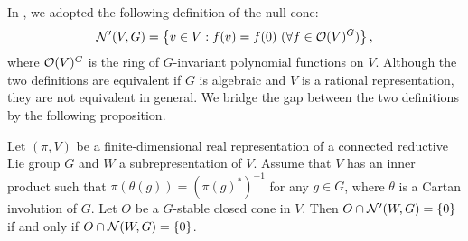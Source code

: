 In \cite{Ki24}, we adopted the following definition of the null cone:
\begin{align*}
	\mathcal{N}'(V, G) = \left\{v \in V: f(v) = f(0) \ (\forall f \in \mathcal{O}(V)^G) \right\},
\end{align*}
where $\mathcal{O}(V)^G$ is the ring of $G$-invariant polynomial functions on $V$.
Although the two definitions are equivalent if $G$ is algebraic and $V$ is a rational representation, they are not equivalent in general.
We bridge the gap between the two definitions by the following proposition.

\begin{proposition} \label{prop:NullCone}
	Let $(\pi, V)$ be a finite-dimensional real representation of a connected reductive Lie group $G$ and $W$ a subrepresentation of $V$.
	Assume that $V$ has an inner product such that $\pi(\theta(g)) = (\pi(g)^*)^{-1}$ for any $g \in G$, where $\theta$ is a Cartan involution of $G$.
	Let $O$ be a $G$-stable closed cone in $V$.
	Then $O \cap \mathcal{N}'(W, G) = \left\{0 \right\}$ if and only if $O \cap \mathcal{N}(W, G) = \left\{0 \right\}$.
\end{proposition}

